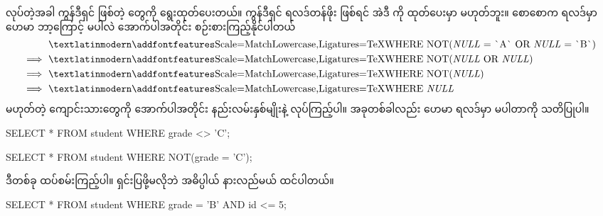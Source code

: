  လုပ်တဲ့အခါ  ကွန်ဒီရှင်  ဖြစ်တဲ့  တွေကို ရွေးထုတ်ပေးတယ်။  ကွန်ဒီရှင် ရလဒ်တန်ဖိုး  ဖြစ်ရင် အဲဒီ  ကို ထုတ်ပေးမှာ မဟုတ်ဘူး။ စောစောက  ရလဒ်မှာ ဟေမာ ဘာ့ကြောင့်  မပါလဲ အောက်ပါအတိုင်း စဉ်းစားကြည့်နိုင်ပါတယ်%
%
\[
\begin{aligned}
         &\text{\fEn{WHERE NOT(\textit{NULL} = \`{}A\`{} OR \textit{NULL} = \`{}B\`{})}}\\
\implies &\text{\fEn{WHERE NOT(\textit{NULL} OR \textit{NULL})}}\\
\implies &\text{\fEn{WHERE NOT(\textit{NULL})}}\\
\implies &\text{\fEn{WHERE \textit{NULL}}}\\
\end{aligned}%
\]
 မဟုတ်တဲ့ ကျောင်းသားတွေကို အောက်ပါအတိုင်း နည်းလမ်းနှစ်မျိုးနဲ့  လုပ်ကြည့်ပါ။ အခုတစ်ခါလည်း ဟေမာ ရလဒ်မှာ မပါတာကို သတိပြုပါ။
%
\begin{sql}
SELECT * FROM student WHERE grade <> 'C';
\end{sql}
%
%
\begin{sql}
SELECT * FROM student WHERE NOT(grade = 'C');
\end{sql}
%
ဒီတစ်ခု ထပ်စမ်းကြည့်ပါ။ ရှင်းပြဖို့မလိုဘဲ အဓိပ္ပါယ် နားလည်မယ် ထင်ပါတယ်။
%
\begin{sql}
SELECT * FROM student WHERE grade = 'B' AND id <= 5;
\end{sql}
%

